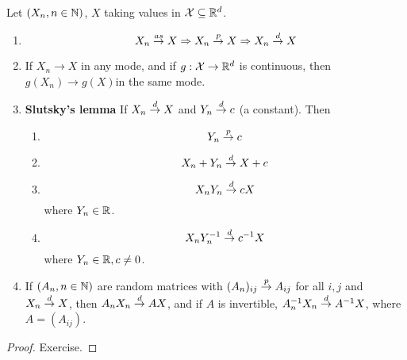 \begin{proposition}
  Let $(X_{n}, n \in \mathbb{N})$, $X$ taking values in $\mathcal{X} \subseteq
  \mathbb{R}^{d}$.
  \begin{enumerate}
  \item
    \begin{equation}
      \label{eq:9}
      X_{n} \overset{as}{\rightarrow} X \Rightarrow X_{n} \overset{p}{\rightarrow} X \Rightarrow X_{n} \overset{d}{\rightarrow} X
    \end{equation}
  \item If $X_{n} \rightarrow X$ in any mode, and if $g: \mathcal{X}
    \rightarrow \mathbb{R}^{d}$ is continuous, then $g(X_{n}) \rightarrow
    g(X)$in the same mode.
  \item \textbf{Slutsky's lemma} If $X_{n} \overset{d}{\rightarrow} X$ and $Y_{n} \overset{d}{\rightarrow} c$ (a
    constant). Then
    \begin{enumerate}
    \item
      \begin{equation}
        \label{eq:10}
        Y_{n} \overset{p}{\rightarrow} c
      \end{equation}
    \item
      \begin{equation}
        \label{eq:11}
        X_{n} + Y_{n}\overset{d}{\rightarrow} X + c
      \end{equation}

    \item
      \begin{equation}
        \label{eq:12}
        X_{n} Y_{n} \overset{d}{\rightarrow} cX
      \end{equation} where $Y_{n} \in \mathbb{R}$.
    \item
      \begin{equation}
        \label{eq:13}
        X_{n} Y_{n}^{{-1}} \overset{d}{\rightarrow} c^{-1} X
      \end{equation} where $Y_{n} \in \mathbb{R}, c \neq 0$.
    \end{enumerate}
  \item If $(A_{n}, n \in \mathbb{N})$ are random matrices with
    $(A_{n})_{{ij}} \overset{p}{\rightarrow} A_{ij}$ for all $i, j$ and $X_{n} \overset{d}{\rightarrow} X$, then
    $A_{n} X_{n} \overset{d}{\rightarrow} AX$, and if $A$ is invertible, $A_{n}^{-1} X_{n}
    \overset{d}{\rightarrow} A^{-1}X$, where $A = (A_{ij})$.
  \end{enumerate}
\end{proposition}

\begin{proof}
  Exercise.
\end{proof}


